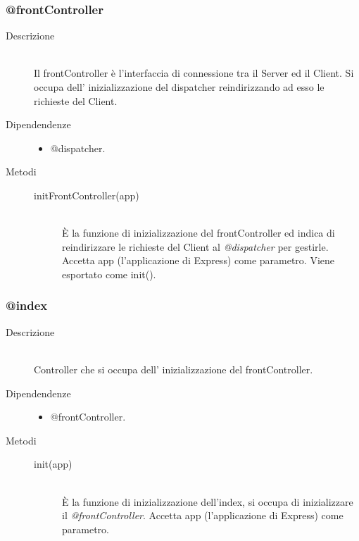 \subsubsection{@frontController}
\begin{description}
 \item[Descrizione] \hfill \\
 Il frontController è l'interfaccia di connessione tra il Server ed il Client. Si occupa dell' inizializzazione del dispatcher reindirizzando ad esso le richieste del Client.
 \item[Dipendendenze] \hfill
 \begin{itemize}
 \item @dispatcher.
 \end{itemize}
 \item[Metodi] \hfill
  \begin{description}
    \item[initFrontController(app)] \hfill \\
  	\`{E} la funzione di inizializzazione del frontController ed indica di reindirizzare le richieste del Client al \textit{@dispatcher} per gestirle. Accetta  app (l'applicazione di Express) come parametro. Viene esportato come init().
  \end{description}
\end{description}

\subsubsection{@index}
\begin{description}
 \item[Descrizione] \hfill \\
  Controller che si occupa dell' inizializzazione del frontController.
 \item[Dipendendenze] \hfill
 \begin{itemize}
 \item @frontController.
 \end{itemize}
 \item[Metodi] \hfill
  \begin{description}
    \item[init(app)]\hfill \\
  	\`{E} la funzione di inizializzazione dell'index, si occupa di inizializzare il \textit{@frontController}. Accetta  app (l'applicazione di Express) come parametro.
  \end{description}
\end{description}

